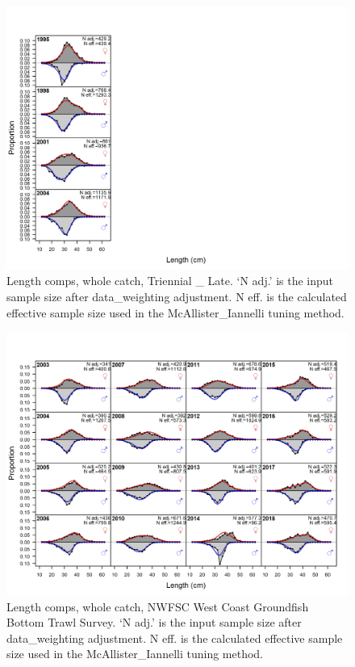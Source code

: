 \documentclass[12pt,]{article}
\begin{document}
\begin{figure}
\centering
\includegraphics{r4ss/plots_mod1/comp_lenfit_flt6mkt0.png}
\caption{Length comps, whole catch, Triennial \_ Late. `N adj.' is the
input sample size after data\_weighting adjustment. N eff. is the
calculated effective sample size used in the McAllister\_Iannelli tuning
method. \label{fig:length_fits}}
\end{figure}

\begin{figure}
\centering
\includegraphics{r4ss/plots_mod1/comp_lenfit_flt7mkt0.png}
\caption{Length comps, whole catch, NWFSC West Coast Groundfish Bottom
Trawl Survey. `N adj.' is the input sample size after data\_weighting
adjustment. N eff. is the calculated effective sample size used in the
McAllister\_Iannelli tuning method. \label{fig:length_fits}}
\end{figure}
\end{document}
